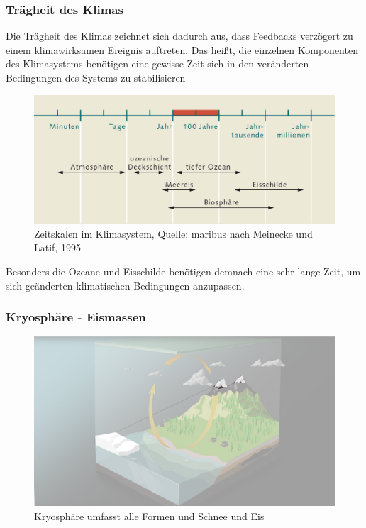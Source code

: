 \begin{frame}
	\frametitle{Trägheit des Klimas}
	Die Trägheit des Klimas zeichnet sich dadurch aus, dass Feedbacks verzögert zu einem klimawirksamen Ereignis auftreten. Das heißt, die einzelnen Komponenten des Klimasystems benötigen eine gewisse Zeit sich in den veränderten Bedingungen des Systems zu stabilisieren
	
	
	\begin{figure}
		\centering
		\includegraphics[width=0.8\linewidth]{bilder/zeitskala-klimasystem_world_ocean_review.jpg}
		\caption{Zeitskalen im Klimasystem, Quelle: maribus nach Meinecke und Latif, 1995}
		\label{fig:traegheit}
	\end{figure}
	
	Besonders die Ozeane und Eisschilde benötigen demnach eine sehr lange Zeit, um sich geänderten klimatischen Bedingungen anzupassen.
\end{frame}

\begin{frame}
	\frametitle{Kryosphäre - Eismassen}
	
	\begin{figure}
		\centering
		\includegraphics{bilder/WMO_Cycles_ice.png}
		\caption{Kryosphäre umfasst alle Formen und Schnee und Eis}
	\end{figure}
\end{frame}

